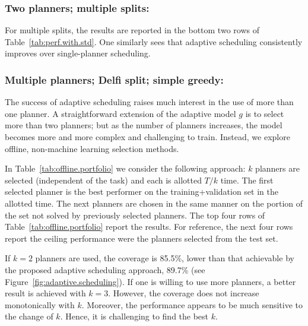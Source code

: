\documentclass[letterpaper]{article} %
\begin{document}
\subsubsection{Two planners; multiple splits:} For multiple splits, the results are reported in the bottom two rows of Table~\ref{tab:perf.with.std}. One similarly sees that adaptive scheduling consistently improves over single-planner scheduling.

\subsubsection{Multiple planners; Delfi split; simple greedy:} The success of adaptive scheduling raises much interest in the use of more than one planner. A straightforward extension of the adaptive model $g$ is to select more than two planners; but as the number of planners increases, the model becomes more and more complex and challenging to train. Instead, we explore offline, non-machine learning selection methods.

In Table~\ref{tab:offline.portfolio} we consider the following approach: $k$
planners are selected (independent of the task) and each is allotted $T/k$ time.
The first selected planner is the best performer on the training+validation set in the allotted time. The next planners are
chosen in the same manner on the portion of the set not solved by previously selected planners. The top four rows of
Table~\ref{tab:offline.portfolio} report the results. For reference, the next four rows
report the ceiling performance were the planners selected
from the test set.

If $k=2$ planners are used, the coverage is 85.5\%, lower than that
achievable by the proposed adaptive scheduling approach, 89.7\% (see
Figure~\ref{fig:adaptive.scheduling}). If one is willing to use more planners, a better result is achieved with $k=3$. However, the coverage does not increase
monotonically with $k$. Moreover, the performance appears to be much sensitive to the change of $k$. Hence, it is challenging to
find the best $k$.
\end{document}
